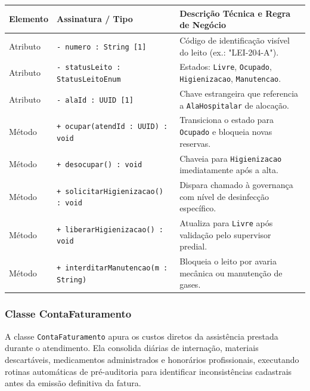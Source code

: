 \begingroup
\small
\noindent\begin{tabularx}{\linewidth}{l >{\raggedright\arraybackslash}p{5.7cm} >{\raggedright\arraybackslash}X}
\toprule
\textbf{Elemento} & \textbf{Assinatura / Tipo} & \textbf{Descrição Técnica e Regra de Negócio} \\
\midrule
Atributo & \texttt{- numero : String [1]} & Código de identificação visível do leito (ex.: "LEI-204-A"). \\
Atributo & \texttt{- statusLeito : StatusLeitoEnum} & Estados: \texttt{Livre}, \texttt{Ocupado}, \texttt{Higienizacao}, \texttt{Manutencao}. \\
Atributo & \texttt{- alaId : UUID [1]} & Chave estrangeira que referencia a \texttt{AlaHospitalar} de alocação. \\
\midrule
Método & \texttt{+ ocupar(atendId : UUID) : void} & Transiciona o estado para \texttt{Ocupado} e bloqueia novas reservas. \\
Método & \texttt{+ desocupar() : void} & Chaveia para \texttt{Higienizacao} imediatamente após a alta. \\
Método & \texttt{+ solicitarHigienizacao() : void} & Dispara chamado à governança com nível de desinfecção específico. \\
Método & \texttt{+ liberarHigienizacao() : void} & Atualiza para \texttt{Livre} após validação pelo supervisor predial. \\
Método & \texttt{+ interditarManutencao(m : String)} & Bloqueia o leito por avaria mecânica ou manutenção de gases. \\
\bottomrule
\end{tabularx}
\endgroup

\subsubsection{Classe ContaFaturamento}
A classe \texttt{ContaFaturamento} apura os custos diretos da assistência prestada durante o atendimento. Ela consolida diárias de internação, materiais descartáveis, medicamentos administrados e honorários profissionais, executando rotinas automáticas de pré-auditoria para identificar inconsistências cadastrais antes da emissão definitiva da fatura.

